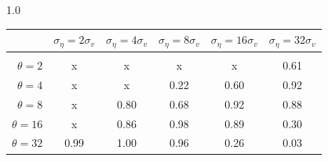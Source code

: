 \documentclass[12pt]{article}
\begin{document}
\begin{table}[h!]
\vspace{10pt}
\begin{subtable}{1.0\textwidth}
    \centering
\begin{tabular}{rccccc}
\hline  
            & \multicolumn{1}{l}{$\sigma_{\eta} =2\sigma_{v}$} & \multicolumn{1}{l}{$\sigma_{\eta} =4\sigma_{v}$} & \multicolumn{1}{l}{$\sigma_{\eta} =8\sigma_{v}$} & \multicolumn{1}{l}{$\sigma_{\eta} =16\sigma_{v}$} & \multicolumn{1}{l}{$\sigma_{\eta} =32\sigma_{v}$} \\ \hline  \vspace{-3mm} \\        
$\theta=2$  & x                                                 & x                                                 & x                                                 & x                                                  & 0.61                                               \\ \hline
$\theta=4$  & x                                                 & x                                                 & 0.22                                              & 0.60                                               & 0.92                                               \\ \hline
$\theta=8$  & x                                                 & 0.80                                              & 0.68                                              & 0.92                                               & 0.88                                               \\ \hline
$\theta=16$ & x                                                 & 0.86                                              & 0.98                                              & 0.89                                               & 0.30                                               \\ \hline
$\theta=32$ & 0.99                                              & 1.00                                              & 0.96                                              & 0.26                                               & 0.03                                               \\ \hline
\end{tabular}
\end{subtable}


\end{table}
\end{document}
